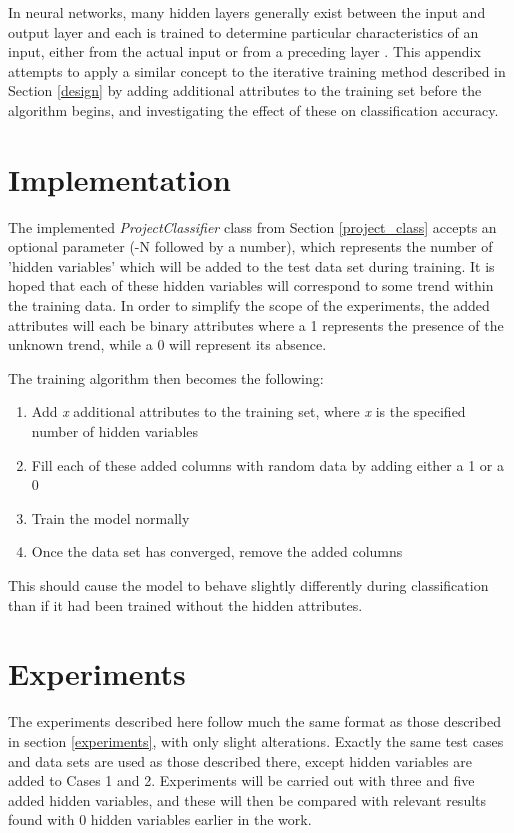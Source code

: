 
In neural networks, many hidden layers generally exist between the input and output layer and each is trained to determine particular characteristics of an input, either from the actual input or from a preceding layer \cite{stackexchange_nn}. This appendix attempts to apply a similar concept to the iterative training method described in Section \ref{design} by adding additional attributes to the training set before the algorithm begins, and investigating the effect of these on classification accuracy.

\section{Implementation}

The implemented \textit{ProjectClassifier} class from Section \ref{project_class} accepts an optional parameter (-N followed by a number), which represents the number of 'hidden variables' which will be added to the test data set during training. It is hoped that each of these hidden variables will correspond to some trend within the training data. In order to simplify the scope of the experiments, the added attributes will each be binary attributes where a 1 represents the presence of the unknown trend, while a 0 will represent its absence. 

The training algorithm then becomes the following:

\begin{enumerate}
\item Add \textit{x} additional attributes to the training set, where \textit{x} is the specified number of hidden variables
\item Fill each of these added columns with random data by adding either a 1 or a 0
\item Train the model normally
\item Once the data set has converged, remove the added columns
\end{enumerate}

This should cause the model to behave slightly differently during classification than if it had been trained without the hidden attributes.

\section{Experiments}

The experiments described here follow much the same format as those described in section \ref{experiments}, with only slight alterations. Exactly the same test cases and data sets are used as those described there, except hidden variables are added to Cases 1 and 2. Experiments will be carried out with three and five added hidden variables, and these will then be compared with relevant results found with 0 hidden variables earlier in the work.

